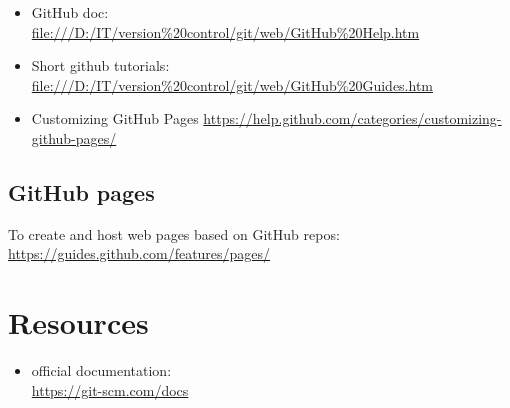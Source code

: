 \documentclass{report}
\begin{document}
\begin{itemize}

\item GitHub doc:\\
\url{file:///D:/IT/version%20control/git/web/GitHub%20Help.htm}

\item Short github tutorials:\\
\url{file:///D:/IT/version%20control/git/web/GitHub%20Guides.htm}

\item Customizing GitHub Pages
\url{https://help.github.com/categories/customizing-github-pages/}
\end{itemize}

\section{GitHub pages}
To create and host web pages based on GitHub repos:\\
\url{https://guides.github.com/features/pages/}



\chapter{Resources}
\begin{itemize}
	\item official documentation:\\
	\url{https://git-scm.com/docs}
\end{itemize}
\end{document}
